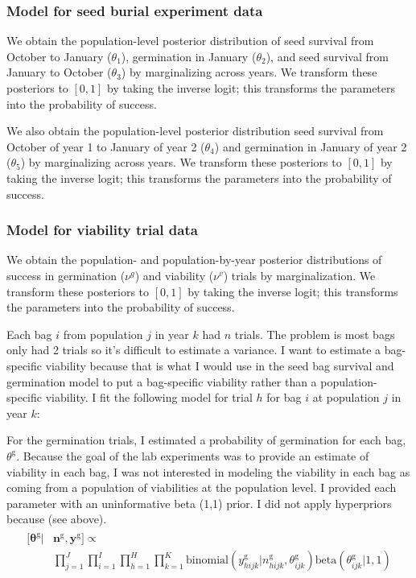 \documentclass[12pt, oneside, titlepage]{article}   	%
\begin{document}
\subsubsection{Model for seed burial experiment data}

We obtain the population-level posterior distribution of seed survival from October to January ($\theta_1$), germination in January ($\theta_2$), and seed survival from January to October ($\theta_3$) by marginalizing across years. We transform these posteriors to $[0,1]$ by taking the inverse logit; this transforms the parameters into the probability of success.

We also obtain the population-level posterior distribution seed survival from October of year 1 to January of year 2 ($\theta_4$) and germination in January of year 2 ($\theta_5$) by marginalizing across years. We transform these posteriors to $[0,1]$ by taking the inverse logit; this transforms the parameters into the probability of success.

\subsubsection{Model for viability trial data}

We obtain the population- and population-by-year posterior distributions of success in germination ($\nu^g$) and viability ($\nu^v$) trials by marginalization. We transform these posteriors to $[0,1]$ by taking the inverse logit; this transforms the parameters into the probability of success.

\iffalse
Each bag $i$ from population $j$ in year $k$ had $n$ trials. The problem is most bags only had 2 trials so it's difficult to estimate a variance. I want to estimate a bag-specific viability because that is what I would use in the seed bag survival and germination model to put a bag-specific viability rather than a population-specific viability. I fit the following model for trial $h$ for bag $i$ at population $j$ in year $k$:

For the germination trials, I estimated a probability of germination for each bag, $\theta^\mathrm{g}$. Because the goal of the lab experiments was to provide an estimate of viability in each bag, I was not interested in modeling the viability in each bag as coming from a population of viabilities at the population level. I provided each parameter with an uninformative beta (1,1) prior. I did not apply hyperpriors because (see above).
%
\begin{align}
  \begin{split}
 [\bm{\theta^{\mathrm{g}}} | & \bm{n^{\mathrm{g}}}, \bm{y^{\mathrm{g}}} ] \propto
 \\  & \prod_{j=1}^{J} \prod_{i=1}^{I}  \prod_{h=1}^{H} \prod_{k=1}^{K}  \mathrm{binomial} ( y^{\mathrm{g}}_{hijk} | n^{\mathrm{g}}_{hijk}, \theta^{\mathrm{g}}_{ijk} )
\mathrm{beta} (  \theta^{\mathrm{g}}_{ijk} | 1 , 1 )
  \end{split}
\end{align}
\end{document}
